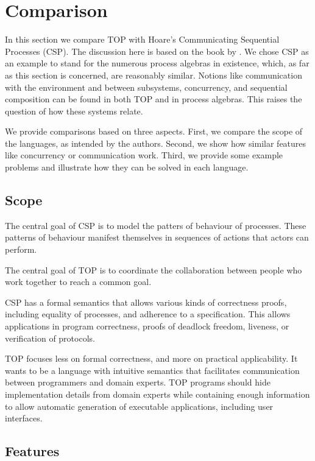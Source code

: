 
\section{Comparison}

In this section we compare TOP with Hoare's Communicating Sequential Processes (CSP).
The discussion here is based on the book by \citet{books/Hoare85CSP}.
We chose CSP as an example to stand for the numerous process algebras in existence, which, as far as this section is concerned, are reasonably similar.
Notions like communication with the environment and between subsystems, concurrency, and sequential composition can be found in both TOP and in process algebras.
This raises the question of how these systems relate.

We provide comparisons based on three aspects.
First, we compare the scope of the languages, as intended by the authors.
Second, we show how similar features like concurrency or communication work.
Third, we provide some example problems and illustrate how they can be solved in each language.

\subsection{Scope}

The central goal of CSP is to model the patters of behaviour of processes.
These patterns of behaviour manifest themselves in sequences of actions that actors can perform.

The central goal of TOP is to coordinate the collaboration between people who work together to reach a common goal.

CSP has a formal semantics that allows various kinds of correctness proofs, including equality of processes, and adherence to a specification.
This allows applications in program correctness, proofs of deadlock freedom, liveness, or verification of protocols.

TOP focuses less on formal correctness, and more on practical applicability.
It wants to be a language with intuitive semantics that facilitates communication between programmers and domain experts.
TOP programs should hide implementation details from domain experts while containing enough information to allow automatic generation of executable applications, including user interfaces.

\subsection{Features}

